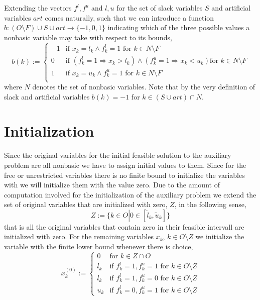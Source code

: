 \documentclass[a4paper]{article}
\begin{document}
Extending the vectors $f^{l}, f^{u}$ and $l, u$ for the set of slack variables
$S$ and artificial variables $art$ comes naturally, such that we can introduce  
a function $b: (O \setminus F) \cup S \cup art \rightarrow \{-1, 0, 1\}$
indicating which of
the three possible values a nonbasic variable may take with respect to its
bounds,
\begin{equation}
b(k):= \left\{
\begin{array}{ll}
-1
&
\mbox{if $x_{k}=l_{k} \wedge f_{k}^{l}=1$ for $k \in N \setminus F$} \\
0
&
\mbox{if $\left(f_{k}^{l}=1 \Rightarrow x_{k} > l_{k}\right) \wedge
          \left(f_{k}^{u}=1 \Rightarrow x_{k} < u_{k}\right)$
          for $k \in N \setminus F$} \\
1
&
\mbox{if $x_{k}=u_{k} \wedge f_{k}^{u}=1$ for $k \in N \setminus F$} \\
\end{array}
\right.
\end{equation}
where $N$ denotes the set of nonbasic variables. Note that by the very definition of slack and artificial variables $b(k)=-1$ for
$k \in (S \cup art) \cap N$.   
\section{Initialization}
Since the original variables for the initial feasible solution to the auxiliary problem are all nonbasic we have to assign initial values to them. Since for the free or unrestricted variables there is no finite bound to initialize the variables with we will initialize them with the value zero. Due to the amount of computation involved for the initialization of the auxiliary problem we extend the set of original variables that are initialized with zero, $Z$, in the following sense, 
\begin{equation}
\label{def:Z}
Z:=\{ k \in O \left|\right. 0 \in \left[\tilde{l}_{k}, \tilde{u}_{k}\right]\} 
\end{equation}
that is all the original variables that contain zero in their feasible intervall are initialized with zero. For the remaining variables $x_{k}$,
$k \in O \setminus Z$ we initialize the variable with the finite lower bound whenever there is choice,
\begin{equation}
x_{k}^{(0)}:=\left\{
\begin{array}{ll}
0
&
\mbox{for $k \in Z \cap O$} \\
l_{k}
&
\mbox{if $f_{k}^{l}=1, f_{k}^{u}=1$ for $k \in O \setminus Z$} \\
l_{k}
&
\mbox{if $f_{k}^{l}=1, f_{k}^{u}=0$ for $k \in O \setminus Z$} \\
u_{k}
&
\mbox{if $f_{k}^{l}=0, f_{k}^{u}=1$ for $k \in O \setminus Z$}
\end{array}
\right.
\end{equation}
\end{document}
